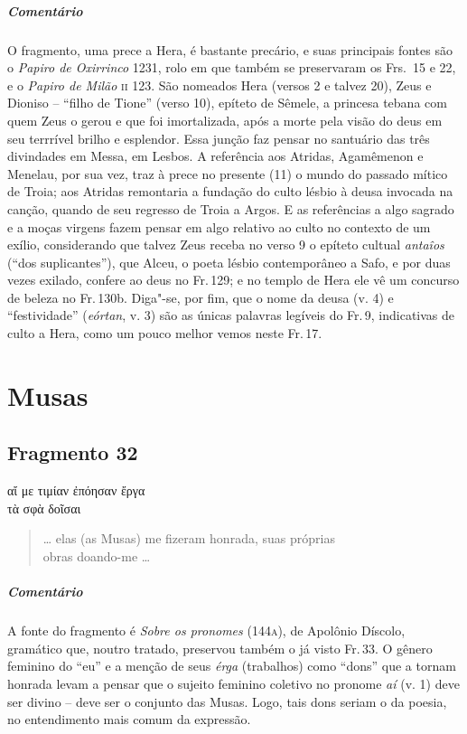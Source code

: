 \pagebreak
{\paragraph{Comentário} O fragmento, uma prece a Hera, é bastante precário, e suas principais fontes são o \textit{Papiro de Oxirrinco} 1231, rolo em que também se preservaram os Frs.~15 e 22, e o \textit{Papiro de Milão} \textsc{ii} 123. São nomeados Hera (versos 2 e talvez 20), Zeus e Dioniso -- ``filho de Tione'' (verso 10), epíteto de Sêmele, a princesa tebana com quem Zeus o gerou e que foi imortalizada, após a morte pela visão do deus em seu terrrível brilho e esplendor. Essa junção faz pensar no santuário das três divindades em Messa, em Lesbos. A referência aos Atridas, Agamêmenon e Menelau, por sua vez, traz à prece no presente (11) o mundo do passado mítico de Troia; aos Atridas remontaria a fundação do culto lésbio à deusa invocada na canção, quando de seu regresso de Troia a Argos. E as referências a algo sagrado e a moças virgens
fazem pensar em algo relativo ao culto no contexto de um exílio, considerando que talvez Zeus receba no verso 9 o epíteto cultual \textit{antaîos} (``dos suplicantes''), que Alceu, o poeta lésbio contemporâneo a Safo, e por duas vezes exilado, confere ao deus no Fr.\,129; e no templo de Hera ele vê um concurso de beleza no Fr.\,130b. Diga"-se, por fim, que o nome da deusa (v. 4) e ``festividade'' (\textit{eórtan}, v. 3) são as únicas palavras legíveis do Fr.\,9, indicativas de culto a Hera, como um pouco melhor vemos neste Fr.\,17.}



\chapter{Musas}

\section{Fragmento 32}

\begin{gkverse}
αἴ με τιμίαν ἐπόησαν ἔργα\\
τὰ σφὰ δοῖσαι
\end{gkverse}

\begin{verse}
\ldots{} elas (as Musas) me fizeram honrada, suas próprias\\
obras doando-me \ldots{}
\end{verse}

{\paragraph{Comentário} A fonte do fragmento é \textit{Sobre os pronomes} (144\textsc{a}), de Apolônio
Díscolo, gramático que, noutro tratado, preservou também o já visto Fr.\,33. O
gênero feminino do “eu” e a menção de seus \textit{érga }(trabalhos) como
``dons” que a tornam honrada levam a pensar que o sujeito feminino
coletivo no pronome \textit{aí} (v. 1) deve ser divino -- deve ser o conjunto das Musas. Logo, tais dons
seriam o da poesia, no entendimento mais comum da expressão.}


